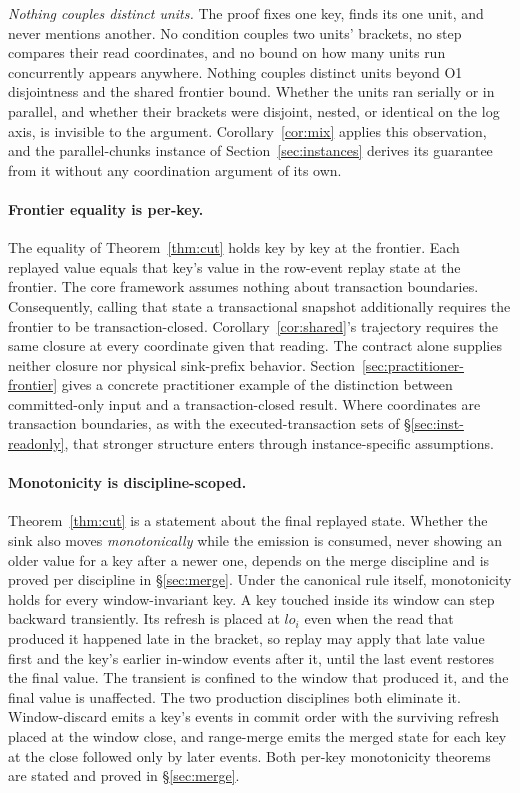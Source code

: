 \documentclass[sigconf,nonacm,10pt]{acmart}
\theoremstyle{plain}
\theoremstyle{definition}
\begin{document}
\emph{Nothing couples distinct units.} The proof fixes one key,
finds its one unit, and never mentions another. No condition couples 
two units' brackets, no step compares their read coordinates, and no
bound on how many units run concurrently appears anywhere. Nothing
couples distinct units beyond O1 disjointness and the shared frontier
bound. Whether the units ran serially or in parallel, and whether
their brackets were disjoint, nested, or identical on the log axis,
is invisible to the argument. Corollary~\ref{cor:mix} applies this
observation, and the parallel-chunks instance of
Section~\ref{sec:instances} derives its guarantee from it without any
coordination argument of its own.

\paragraph{Frontier equality is per-key.}
The equality of Theorem~\ref{thm:cut} holds key by key at the
frontier. Each replayed value equals that key's value in the
row-event replay state at the frontier. The core framework assumes 
nothing about transaction boundaries. Consequently, calling that state a 
transactional snapshot additionally requires the frontier to be
transaction-closed. Corollary~\ref{cor:shared}'s trajectory requires
the same closure at every coordinate given that reading. The
contract alone supplies neither closure nor physical sink-prefix
behavior. Section~\ref{sec:practitioner-frontier} gives a concrete
practitioner example of the distinction between committed-only input
and a transaction-closed result. Where coordinates are transaction
boundaries, as with the
executed-transaction sets of \S\ref{sec:inst-readonly}, that stronger 
structure enters through instance-specific assumptions.

\paragraph{Monotonicity is discipline-scoped.}
Theorem~\ref{thm:cut} is a statement about the final replayed state.
Whether the sink also moves \emph{monotonically} while the emission
is consumed, never showing an older value for a key after a newer
one, depends on the merge discipline and is proved per discipline in
\S\ref{sec:merge}. Under the canonical rule itself, monotonicity
holds for every window-invariant key. A key touched inside
its window can step backward transiently. Its refresh is placed at
$lo_i$ even when the read that produced it happened late in the
bracket, so replay may apply that late value first and the key's
earlier in-window events after it, until the last event restores
the final value. The transient is confined to the window that
produced it, and the final value is unaffected. The two production
disciplines both eliminate it. Window-discard emits a key's events
in commit order with the surviving refresh placed at the window
close, and range-merge emits the merged state for each key at the close
followed only by later events. Both per-key monotonicity theorems
are stated and proved in \S\ref{sec:merge}.
\end{document}
